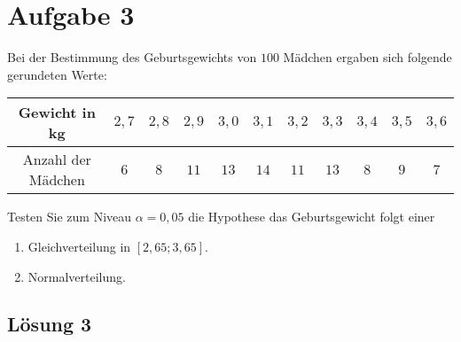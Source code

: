 \documentclass[main.tex]{subfiles}
\begin{document}
\section{Aufgabe 3}
Bei der Bestimmung des Geburtsgewichts von $100$ Mädchen ergaben sich folgende gerundeten Werte:
\begin{center}
	\begin{tabular}{c|c|c|c|c|c|c|c|c|c|c}
		Gewicht in kg & $2,7$ & $2,8$ & $2,9$ & $3,0$ & $3,1$
			& $3,2$ & $3,3$ & $3,4$ & $3,5$ & $3,6$ \\ \hline
		Anzahl der Mädchen & $6$ & $8$ & $11$ & $13$ & $14$
			& $11$ & $13$ & $8$ & $9$ & $7$
	\end{tabular}
\end{center}
Testen Sie zum Niveau $\alpha = 0,05$ die Hypothese das Geburtsgewicht folgt einer
\begin{enumerate}
	\item Gleichverteilung in $[2,65; 3,65]$.
	\item Normalverteilung.
\end{enumerate}

\subsection{Lösung 3}
\end{document}
